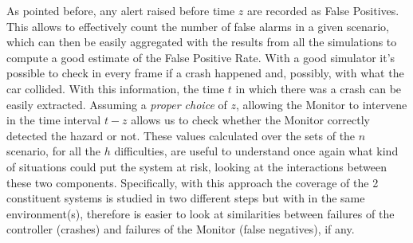 As pointed before, any alert raised before time $z$ are recorded as False Positives. This allows to effectively count the number of false alarms in a given scenario, which can then be easily aggregated with the results from all the simulations to compute a good estimate of the False Positive Rate.\newline
With a good simulator it's possible to check in every frame if a crash happened and, possibly, with what the car collided. With this information, the time $t$ in which there was a crash can be easily extracted. Assuming a \textsl{proper choice} of $z$, allowing the Monitor to intervene in the time interval $t-z$ allows us to check whether the Monitor correctly detected the hazard or not.\newline
These values calculated over the sets of the $n$ scenario, for all the $h$ difficulties, are useful to understand once again what kind of situations could put the system at risk, looking at the interactions between these two components. Specifically, with this approach the coverage of the 2 constituent systems is studied in two different steps but with in the same environment(s), therefore is easier to look at similarities between failures of the controller (crashes) and failures of the Monitor (false negatives), if any.